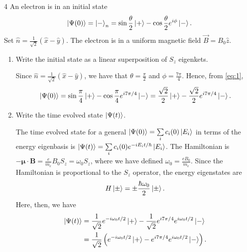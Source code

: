 \documentclass[11pt]{article}
\begin{document}
\begin{problem}{4}
  An electron is in an initial state
  \begin{equation}
  \label{eq:1}
  \ket{\Psi(0)} = \ket{-}_n = \sin \frac{\theta}{2}\ket{+} - \cos \frac{\theta}{2}e^{i\phi}\ket{-}.
\end{equation}
Set \( \hat{n} = \frac{1}{\sqrt{2}}(\hat{x} - \hat{y})\).
The electron is in a uniform magnetic field \( \vec{B} = B_0 \hat{z} \).
\begin{enumerate}[label=(\alph*)]
  \item Write the initial state as a linear superposition of \( S_z \) eigenkets.
        \begin{answer}
          Since \( \hat{n} = \frac{1}{\sqrt{2}}(\hat{x} - \hat{y}) \), we have that \( \theta = \frac{\pi}{2} \) and \( \phi = \frac{7\pi}{4} \).
          Hence, from \cref{eq:1},
          \begin{equation}
          \label{eq:14}
          \ket{\Psi(0)} = \sin \frac{\pi}{4}\ket{+} - \cos \frac{\pi}{4}e^{i 7\pi/4}\ket{-} = \frac{\sqrt{2}}{2}\ket{+} - \frac{\sqrt{2}}{2}e^{i 7\pi/4}\ket{-}.
          \end{equation}
        \end{answer}
  \item Write the time evolved state \( \ket{\Psi(t)} \).
        \begin{answer}
          The time evolved state for a general \( \ket{\Psi(0)} = \sum\limits_i c_i(0)\ket{E_{i}} \) in terms of the energy eigenbasis is \( \ket{\Psi(t)} = \sum\limits_i c_i(0)e^{-iE_{i} t/\hbar}\ket{E_{i}}\).
          The Hamiltonian is \(-\mathbf{\mu} \cdot \mathbf{B} = \frac{e}{m_e}B_0 S_z = \omega_0 S_z \), where we have defined \(\omega_0 = \frac{eB_0}{m_{e}}\).
          Since the Hamiltonian is proportional to the \( S_z \) operator, the energy eigenstates are
          \begin{equation}
          \label{eq:16}
          H\ket{\pm} = \pm \frac{\hbar\omega_{0}}{2}\ket{\pm}.
          \end{equation}
          Here, then, we have
          \begin{equation}
          \label{eq:15}
          \begin{aligned}
            \ket{\Psi(t)} &= \frac{1}{\sqrt{2}}e^{-i\omega_0 t/2}\ket{+} - \frac{1}{\sqrt{2}}e^{i7\pi/4}e^{i\omega_0 t/2}\ket{-} \\
            &= \frac{1}{\sqrt{2}} \left( e^{-i\omega_0 t/2}\ket{+} - e^{i7\pi/4}e^{i\omega_{0} t/2} \ket{-} \right).

\end{aligned}
\end{equation}
\end{answer}
\end{enumerate}
\end{problem}
\end{document}
